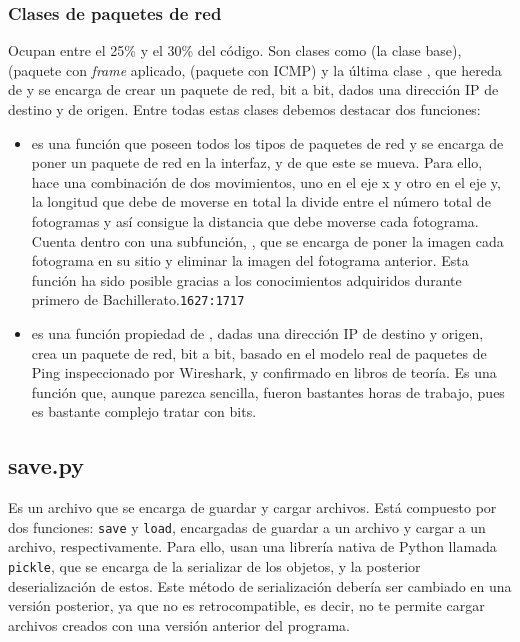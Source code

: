 \documentclass[a4paper, 11pt]{report} %
\begin{document}
\subsubsection{Clases de paquetes de red}
Ocupan entre el 25\% y el 30\% del código. Son clases como  (la clase base),  (paquete con \textit{frame} aplicado,  (paquete con ICMP) y la última clase , que hereda de  y se encarga de crear un paquete de red, bit a bit, dados una dirección IP de destino y de origen.
Entre todas estas clases debemos destacar dos funciones:
\begin{itemize}
\item {} es una función que poseen todos los tipos de paquetes de red y se encarga de poner un paquete de red en la interfaz, y de que este se mueva. Para ello, hace una combinación de dos movimientos, uno en el eje x y otro en el eje y, la longitud que debe de moverse en total la divide entre el número total de fotogramas y así consigue la distancia que debe moverse cada fotograma. Cuenta dentro con una subfunción, , que se encarga de poner la imagen cada fotograma en su sitio y eliminar la imagen del fotograma anterior. Esta función ha sido posible gracias a los conocimientos adquiridos durante primero de Bachillerato.\texttt{1627:1717}
\item {} es una función propiedad de , dadas una dirección IP de destino y origen, crea un paquete de red, bit a bit, basado en el modelo real de paquetes de Ping inspeccionado por Wireshark, y confirmado en libros de teoría. Es una función que, aunque parezca sencilla, fueron bastantes horas de trabajo, pues es bastante complejo tratar con bits.
\end{itemize}

\subsection{save.py}
Es un archivo que se encarga de guardar y cargar archivos. Está compuesto por dos funciones: \texttt{save} y \texttt{load}, encargadas de guardar a un archivo y cargar a un archivo, respectivamente. Para ello, usan una librería nativa de Python llamada \texttt{pickle}, que se encarga de la \gls{serializar} de los objetos, y la posterior deserialización de estos. Este método de serialización debería ser cambiado en una versión posterior, ya que no es retrocompatible, es decir, no te permite cargar archivos creados con una versión anterior del programa.
\end{document}

